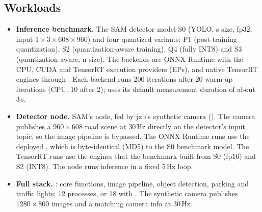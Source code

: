 \documentclass[11pt,a4paper]{article}
\newcommand{\jxb}{\textsf{jxb}}
\begin{document}
\subsection{Workloads}
\begin{itemize}
  \item \textbf{Inference benchmark.} The SAM detector model S0 (YOLO, s size, fp32, input $1\times3\times608\times960$)
        and four quantized variants: P1 (post-training quantization), S2 (quantization-aware training), Q4 (fully
        INT8) and S3 (quantization-aware, n size). The backends are ONNX Runtime with the CPU, CUDA and TensorRT
        execution providers (EPs), and native TensorRT engines through . Each backend runs 200
        iterations after 20 warm-up iterations (CPU: 10 after 2);  uses its default measurement
        duration of about 3\,s.
  \item \textbf{Detector node.} SAM's  node, fed by \jxb's synthetic camera
        (). The camera publishes a $960\times608$ road scene at 30\,Hz directly on the
        detector's input topic, so the image pipeline is bypassed. The ONNX Runtime runs use the deployed
        , which is byte-identical (MD5) to the S0 benchmark model. The TensorRT runs use the engines
        that the benchmark built from S0 (fp16) and S2 (INT8). The node runs inference in a fixed 5\,Hz loop.
  \item \textbf{Full stack.} : core functions, image pipeline, object
        detection, parking and traffic lights; 12 processes, or 18 with . The
        synthetic camera publishes $1280\times800$ images and a matching camera info at 30\,Hz.
\end{itemize}
\end{document}
